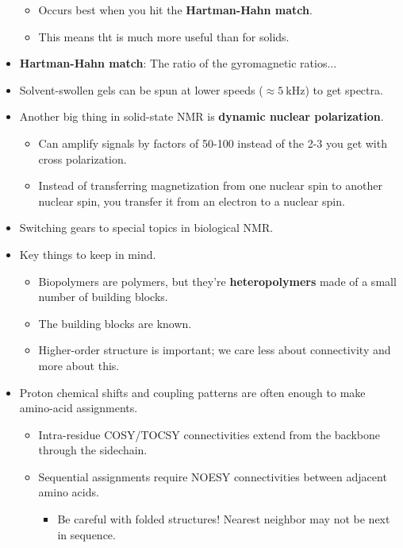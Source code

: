 \documentclass[../notes.tex]{subfiles}
\begin{document}
\begin{itemize}
\begin{itemize}
        \item Occurs best when you hit the \textbf{Hartman-Hahn match}.
        \item This means tht  is much more useful than  for solids.
    \end{itemize}
    \item \textbf{Hartman-Hahn match}: The ratio of the gyromagnetic ratios...
    \item Solvent-swollen gels can be spun at lower speeds ($\approx\SI{5}{\kilo\hertz}$) to get spectra.
    \item Another big thing in solid-state NMR is \textbf{dynamic nuclear polarization}.
    \begin{itemize}
        \item Can amplify signals by factors of 50-100 instead of the 2-3 you get with cross polarization.
        \item Instead of transferring magnetization from one nuclear spin to another nuclear spin, you transfer it from an electron to a nuclear spin.
    \end{itemize}
    \item Switching gears to special topics in biological NMR.
    \item Key things to keep in mind.
    \begin{itemize}
        \item Biopolymers are polymers, but they're \textbf{heteropolymers} made of a small number of building blocks.
        \item The building blocks are known.
        \item Higher-order structure is important; we care less about connectivity and more about this.
    \end{itemize}
    \item Proton chemical shifts and coupling patterns are often enough to make amino-acid assignments.
    \begin{itemize}
        \item Intra-residue COSY/TOCSY connectivities extend from the backbone  through the sidechain.
        \item Sequential assignments require NOESY connectivities between adjacent amino acids.
        \begin{itemize}
            \item Be careful with folded structures! Nearest neighbor may not be next in sequence.
        \end{itemize}
    \end{itemize}

\end{itemize}
\end{document}

